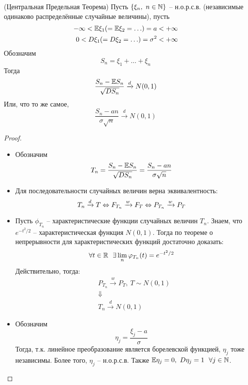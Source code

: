 \begin{theorem} (Центральная Предельная Теорема)
    Пусть $\{\xi_n,\ n \in \mathbb{N}\}$ -- н.о.р.с.в. (независимые одинаково распределённые случайные величины), пусть
    \begin{align*}
        -\infty < \mathbb{E}\xi_1 (=\mathbb{E}\xi_2=\ldots) = a < +\infty
        \\
        0 < D\xi_1 (=D\xi_2=\ldots) = \sigma^2 < +\infty
    \end{align*}
    Обозначим
    \[
        S_n = \xi_1 + \ldots + \xi_n
    \]
    Тогда
    \[
        \frac{S_n - \mathbb{E} S_n}{\sqrt{DS_n}} \xrightarrow{d} N(0, 1)
    \]
    Или, что то же самое,
    \[
        \frac{S_n - an}{\sigma \sqrt{n}} \xrightarrow{d} N(0, 1)
    \]
\end{theorem}

\begin{proof}~
    \begin{itemize}
        \item Обозначим
        \[
            T_n = \frac{S_n - \mathbb{E} S_n}{\sqrt{DS_n}} = \frac{S_n - an}{\sigma \sqrt{n}}
        \]

        \item Для последовательности случайных величин верна эквивалентность:
        \[
            T_n \xrightarrow{d} T \Leftrightarrow F_{T_n} \xrightarrow{w} F_T \Leftrightarrow P_{T_n}\xrightarrow{w} P_T
        \]

        \item Пусть $\phi_{T_n}$ -- характеристические функции случайных величин $T_n$. Знаем, что $e^{-t^2/2}$ -- характеристическая функция $N(0, 1)$. Тогда по теореме о непрерывности для характеристических функций достаточно доказать:
        \[
            \forall t \in \R \ \ \exists \lim_n \phi_{T_n}(t) = e^{-t^2/2}
        \]
        Действительно, тогда:
        \begin{align*}
            & P_{T_n}\xrightarrow{w} P_T,\ T \sim N(0, 1)
            \\
            & \Downarrow
            \\
            & T_n \xrightarrow{d} N(0, 1)
        \end{align*}

        \item Обозначим
        \[
            \eta_j = \frac{\xi_j - a}{\sigma}
        \]
        Тогда, т.к. линейное преобразование является борелевской функцией, $\eta_j$ тоже независимы. Более того, $\eta_j$ -- н.о.р.с.в. Также $\mathbb{E} \eta_j = 0,\ D \eta_j = 1 \ \ \forall j \in \mathbb{N}$.


\end{itemize}
\end{proof}

